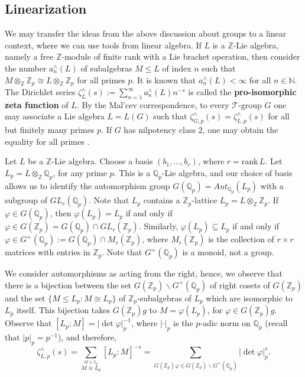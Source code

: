 \documentclass{article}
\begin{document}
\subsection{Linearization}
\label{linearization}
We may transfer the ideas from the above discussion about groups to a linear context, where we can use tools from linear algebra.
If $L$ is a $\mathbb{Z}$-Lie algebra, namely a free $\mathbb{Z}$-module of finite rank with a Lie bracket operation, then consider the number $a_{n}^{\wedge}(L)$ of subalgebras $M\leq L$ of index $n$ such that $M\otimes_{\mathbb{Z}}\mathbb{Z}_p\cong L\otimes_{\mathbb{Z}}\mathbb{Z}_p$ for all primes $p$. It is known that $a_{n}^{\wedge}(L)<\infty$ for all $n\in\mathbb{N}$. The Dirichlet series $\zeta_{L}^{\wedge}(s):=\sum_{n=1}^{\infty}{a_{n}^{\wedge}}(L)n^{-s}$ is called the \textbf{pro-isomorphic zeta function} of $L$. By the Mal'cev correspondence, to every $\mathcal{T}$-group $G$ one may associate a Lie algebra $L=L(G)$ such that $\zeta_{G,p}^{\wedge}(s)=\zeta_{L,p}^{\wedge}(s)$ for all but finitely many primes $p$. If $G$ has nilpotency class $2$, one may obtain the equality for all primes \cite[Theorem 4.1]{GrunewaldSegalSmith}.\par
Let $L$ be a $\mathbb{Z}$-Lie algebra. Choose a basis $(b_1,\dots,b_r)$, where $r=\mathrm{rank}\,L$. Let ${L}_{p}=L\otimes_{\mathbb{Z}}\mathbb{Q}_p$, for any prime $p$. This is a $\mathbb{Q}_p$-Lie algebra, and our choice of basis allows us to identify the automorphism group $G(\mathbb{Q}_p)=Aut_{\mathbb{Q}_p}({L}_{p})$ with a subgroup of $GL_r(\mathbb{Q}_p)$. Note that ${L}_{p}$ contains a $\mathbb{Z}_p$-lattice $L_{p}=L\otimes_{\mathbb{Z}}\mathbb{Z}_p$. If $\varphi\in G(\mathbb{Q}_p)$, then $\varphi(L_{p})=L_{p}$ if and only if $\varphi\in G(\mathbb{Z}_p)=G(\mathbb{Q}_p)\cap GL_r(\mathbb{Z}_p)$. Similarly, $\varphi(L_{p})\subseteq L_{p}$ if and only if $\varphi\in G^{+}(\mathbb{Q}_p):=G(\mathbb{Q}_p)\cap {M}_r(\mathbb{Z}_p)$, where ${M}_r(\mathbb{Z}_p)$ is the collection of $r\times r$ matrices with entries in $\mathbb{Z}_p$. Note that $G^{+}(\mathbb{Q}_p)$ is a monoid, not a group.\par
We consider automorphisms as acting from the right, hence, we observe that there is a bijection between the set $G(\mathbb{Z}_p)\backslash G^{+}(\mathbb{Q}_p)$ of right cosets of $G(\mathbb{Z}_p)$ and the set $\{M\leq L_{p} : M\cong L_{p}\}$ of $\mathbb{Z}_{p}$-subalgebras of $L_{p}$ which are isomorphic to $L_{p}$ itself. This bijection takes $G(\mathbb{Z}_p)g$ to $M=\varphi(L_{p})$, for $\varphi\in G(\mathbb{Z}_p)g$.
Observe that $[L_{p}:M]=|\det\varphi|_p^{-1}$, where $|\cdot|_p$ is the $p$-adic norm on $\mathbb{Q}_{p}$ (recall that $|p|_{p}=p^{-1}$), and therefore,
\begin{equation}
\label{eq:proisomorphic.zeta}
\zeta_{L,p}^{\wedge}(s)=\underset{\overset{\scriptscriptstyle M\leq L_{p}}{\scriptscriptstyle M\cong L_{p}}}{\sum}[L_{p}:M]^{-s}=\underset{\scriptscriptstyle G(\mathbb{Z}_p)\varphi\in G(\mathbb{Z}_p)\backslash G^{+}(\mathbb{Q}_p)}{\sum}|\det\varphi|_p^s.
\end{equation}
\end{document}
